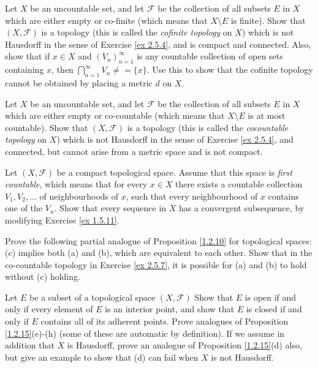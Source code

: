 \begin{exercise}\label{ex 2.5.6}
    Let \(X\) be an uncountable set, and let \(\mathcal{F}\) be the collection of all subsets \(E\) in \(X\) which are either empty or co-finite (which means that \(X \setminus E\) is finite).
    Show that \((X, \mathcal{F})\) is a topology (this is called the \emph{cofinite topology} on \(X\)) which is not Hausdorff in the sense of Exercise \ref{ex 2.5.4}, and is compact and connected.
    Also, show that if \(x \in X\) and \((V_n)_{n = 1}^\infty\) is any countable collection of open sets containing \(x\), then \(\bigcap_{n = 1}^\infty V_n \neq = \{x\}\).
    Use this to show that the cofinite topology cannot be obtained by placing a metric \(d\) on \(X\).
\end{exercise}

\begin{exercise}\label{ex 2.5.7}
    Let \(X\) be an uncountable set, and let \(\mathcal{F}\) be the collection of all subsets \(E\) in \(X\) which are either empty or co-countable
    (which means that \(X \setminus E\) is at most countable).
    Show that \((X, \mathcal{F})\) is a topology (this is called the \emph{cocountable topology} on \(X\)) which is not Hausdorff in the sense of Exercise \ref{ex 2.5.4}, and connected, but cannot arise from a metric space and is not compact.
\end{exercise}

\setcounter{exercise}{8}
\begin{exercise}\label{ex 2.5.9}
    Let \((X, \mathcal{F})\) be a compact topological space.
    Assume that this space is \emph{first countable}, which means that for every \(x \in X\) there exists a countable collection \(V_1 , V_2 , \dots\) of neighbourhoods of \(x\), such that every neighbourhood of \(x\) contains one of the \(V_n\).
    Show that every sequence in \(X\) has a convergent subsequence, by modifying Exercise \ref{ex 1.5.11}.
\end{exercise}

\begin{exercise}\label{ex 2.5.10}
    Prove the following partial analogue of Proposition \ref{1.2.10} for topological spaces:
    (c) implies both (a) and (b), which are equivalent to each other.
    Show that in the co-countable topology in Exercise \ref{ex 2.5.7}, it is possible for (a) and (b) to hold without (c) holding.
\end{exercise}

\begin{exercise}\label{ex 2.5.11}
    Let \(E\) be a subset of a topological space \((X, \mathcal{F})\)
    Show that \(E\) is open if and only if every element of \(E\) is an interior point, and show that \(E\) is closed if and only if \(E\) contains all of its adherent points.
    Prove analogues of Proposition \ref{1.2.15}(e)-(h) (some of these are automatic by definition).
    If we assume in addition that \(X\) is Hausdorff, prove an analogue of Proposition \ref{1.2.15}(d) also, but give an example to show that (d) can fail when \(X\) is not Hausdorff.
\end{exercise}

